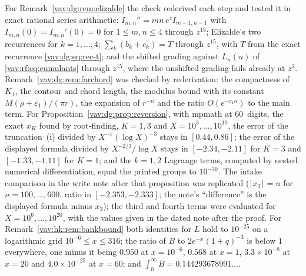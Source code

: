 \documentclass[11pt]{article}
\theoremstyle{remark}\newtheorem{remark}[theorem]{Remark}
\begin{document}
For Remark~\ref{vav:dg:rem:elizalde} the check rederived each step and
tested it in exact rational series arithmetic:
$I_{m,n}''=mn\,e^zI_{m-1,n-1}$ with $I_{m,n}(0)=I_{m,n}'(0)=0$ for
$1\le m,n\le4$ through $z^{13}$; Elizalde's two recurrences for
$k=1,\ldots,4$; $\sum_k(b_k+c_k)=T$ through $z^{15}$, with $T$ from the exact
recurrence \eqref{vav:dg:eq:rec-t}; and the shifted grading against $L_n(u)$
of \eqref{vav:rf:eq:cumulants} through $z^{15}$, where the unshifted grading
fails already at $z^2$. Remark~\ref{vav:dg:rem:farchord} was checked by
rederivation: the compactness of $K_1$, the contour and chord length, the
modulus bound with its constant $M(\rho+\varepsilon_1)/(\pi r)$, the
expansion of $r^{-n}$ and the ratio $O(e^{-c_1n})$ to the main term. For
Proposition~\ref{vav:dg:prop:reversion}, with mpmath at 60~digits, the
exact $x_K$ found by root-finding, $K=1,3$ and $X=10^3,\ldots,10^{10}$, the
error of the truncation~(i) divided by $X^{-1}(\log X)^{-3}$ stays in
$[0.44,0.86]$; the error of the displayed formula divided by
$X^{-2/3}/\log X$ stays in $[-2.34,-2.11]$ for $K=3$ and $[-1.33,-1.11]$ for
$K=1$; and the $k=1,2$ Lagrange terms, computed by nested numerical
differentiation, equal the printed groups to $10^{-30}$. The intake
comparison in the write note after that proposition was replicated
($\lceil x_3\rceil=n$ for $n=100,\ldots,600$, ratio in
$[-2.353,-2.333]$; the note's ``difference'' is the displayed formula minus
$x_3$); the third and fourth terms were evaluated for
$X=10^6,\ldots,10^{20}$, with the values given in the dated note after the
proof. For Remark~\ref{vav:hk:rem:bankbound} both identities for $L$ hold
to $10^{-25}$ on a logarithmic grid $10^{-6}\le x\le316$; the ratio of $B$
to $2e^{-x}(1+q)^{-3}$ is below $1$ everywhere, one minus it being $0.950$
at $x=10^{-6}$, $0.568$ at $x=1$, $3.3\times10^{-8}$ at $x=20$ and
$4.0\times10^{-25}$ at $x=60$; and $\int_0^\infty B=0.144293678991\ldots$.
\end{document}
